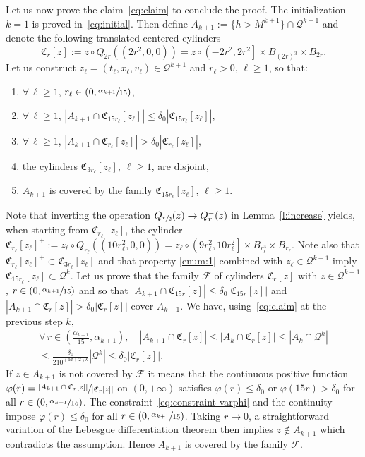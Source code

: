 \documentclass[JEP,XML,SOM,Unicode,NoFloatCountersInSection,published]{cedram}
\let\mathcal\mathscr
\theoremstyle{definition}
\theoremstyle{remark}
\newcommand{\cQ}{\mathcal Q}
\begin{document}
Let us now prove the claim~\eqref{eq:claim} to conclude the
proof. The initialization $k=1$ is proved
in~\eqref{eq:initial}. Then define
$A_{k+1} := \{ h > M^{k+1} \} \cap \cQ^{k+1}$ and denote
the following translated centered cylinders
\[
\mathfrak C_{r}[z] :=z\circ Q_{2r}((2r^2,0,0))= z \circ
\left(-2r^2,2r^2\right]\times B_{(2r)^3} \times B_{2r}.
\]
Let us
construct $z_\ell=(t_\ell,x_\ell,v_\ell)\in \cQ^{k+1}$ and
$r_\ell >0$, $\ell \ge 1$, so that:
\begin{enumerate}
\item\label{enum:1} $\forall \, \ell \ge 1$, $r_\ell \in (0,\sfrac{\alpha_{k+1}}{15})$,
\item\label{enum:2} $\forall \, \ell \ge 1$,
$|A_{k+1} \cap \mathfrak C_{15r_\ell}[z_\ell]| \le \delta_0
|\mathfrak C_{15 r_\ell}[z_\ell]|$,
\item\label{enum:3} $\forall \, \ell \ge 1$,
$|A_{k+1} \cap \mathfrak C_{r_\ell}[z_\ell]| > \delta_0
|\mathfrak C_{r_\ell}[z_\ell]|$,
\item\label{enum:4} the cylinders $\mathfrak C_{3r_\ell}[z_\ell]$, $\ell \ge
1$, are disjoint,
\item\label{enum:5} $A_{k+1}$ is covered by the family $\mathfrak
C_{15r_\ell}[z_\ell]$, $\ell \ge 1$.
\end{enumerate}
Note that inverting the operation
$Q_{\sfrac{r}{2}}(z) \to Q_{r}^-(z)$ in Lemma~\ref{l:increase}
yields, when starting from $\mathfrak C_{r_\ell}[z_\ell]$, the
cylinder
$\mathfrak C_{r_\ell}[z_\ell]^+ :=z_\ell\circ
Q_{r_\ell}((10r_\ell^2,0,0))= z_\ell \circ
\left(9r_\ell^2,10r_\ell^2\right]\times B_{r_\ell^3} \times
B_{r_\ell}$. Note also that
$\mathfrak C_{r_\ell}[z_\ell]^+ \subset \mathfrak C_{3
r_\ell}[z_\ell]$ and that property \eqref{enum:1} combined with
$z_\ell \in \cQ^{k+1}$ imply
$\mathfrak C_{15r_\ell}[z_\ell] \subset \cQ^k$. Let us prove
that the family $\mathcal F$ of cylinders $\mathfrak C_{r}[z]$
with $z \in \cQ^{k+1}$, $r \in (0,\sfrac{\alpha_{k+1}}{15})$ and
so that
$|A_{k+1} \cap \mathfrak C_{15r}[z]| \le \delta_0 |\mathfrak
C_{15 r}[z]|$ and
$|A_{k+1} \cap \mathfrak C_{r}[z]| > \delta_0 |\mathfrak
C_{r}[z]|$ cover $A_{k+1}$. We have, using~\eqref{eq:claim} at
the previous step $k$,
\begin{multline}
\label{eq:constraint-varphi}
\forall \, r \in
\left(\frac{\alpha_{k+1}}{15},\alpha_{k+1}\right), \quad
|A_{k+1} \cap \mathfrak C_{r}[z]| \le |A_{k} \cap \mathfrak
C_{r}[z]| \le |A_{k} \cap \cQ^k| \\
\le \frac{\delta_0}{210^{(4d+2)k}} |\cQ^k| \le \delta_0
|\mathfrak C_{r}[z]|.
\end{multline}
If $z \in A_{k+1}$ is not covered by $\mathcal F$ it means that
the continuous positive function
$\varphi(r) = \sfrac{|A_{k+1} \cap \mathfrak C_{r}[z]|}{|\mathfrak
C_{r}[z]|}$ on $(0,+\infty)$ satisfies $\varphi(r) \le \delta_0$
or $\varphi(15r) > \delta_0$ for all
$r \in (0,\sfrac{\alpha_{k+1}}{15})$. The
constraint~\eqref{eq:constraint-varphi} and the continuity impose
$\varphi(r) \le \delta_0$ for all
$r \in\nobreak (0,\sfrac{\alpha_{k+1}}{15})$. Taking $r \to 0$, a
straightforward variation of the Lebesgue differentiation theorem
then implies $z\notin A_{k+1}$ which contradicts the
assumption. Hence $A_{k+1}$ is covered by the family $\mathcal
F$.
\end{document}

